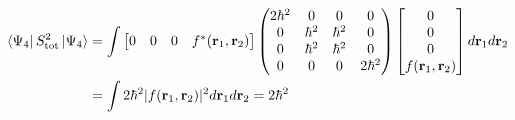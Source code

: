 \documentclass[12pt]{report}
\theoremstyle{custom}
\newcommand{\rb}{\bold{r}}
\begin{document}
\begin{align*}
  \bra{\Psi_4}S_{\text{tot}}^2 \ket{\Psi_4} &= \int \begin{bmatrix} 0 & 0 & 0 & f^*(\rb_1,\rb_2) \end{bmatrix} \begin{pmatrix}2\hbar^2 & 0 & 0 & 0 \\ 0 & \hbar^2 & \hbar^2 & 0 \\ 0 & \hbar^2 & \hbar^2 & 0 \\ 0 & 0 & 0 & 2\hbar^2\end{pmatrix}  \begin{bmatrix} 0 \\ 0 \\ 0 \\ f(\rb_1,\rb_2) \end{bmatrix} d\rb_1 d\rb_2 \\
                                            &=  \int 2\hbar^2 |f(\rb_1,\rb_2)|^2 d\rb_1 d\rb_2 = 2\hbar^2
\end{align*}
\end{document}

